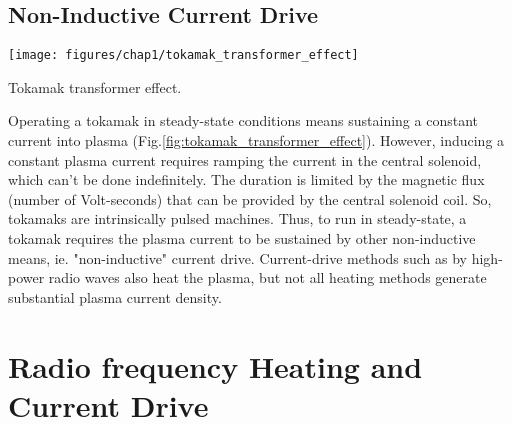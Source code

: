 \subsection{Non-Inductive Current Drive}
\begin{marginfigure}
	\texttt{[image: figures/chap1/tokamak\_transformer\_effect]}
	\caption{Tokamak transformer effect.}
	\label{fig:tokamak_transformer_effect}
\end{marginfigure}
Operating a tokamak in steady-state conditions means sustaining a constant current into plasma (Fig.\ref{fig:tokamak_transformer_effect}). However, inducing a constant plasma current requires ramping the current in the central solenoid, which can't be done indefinitely. The duration is limited by the magnetic flux (number of Volt-seconds) that can be provided by the central solenoid coil. So, tokamaks are intrinsically pulsed machines.
Thus, to run in steady-state, a tokamak requires the plasma current to be sustained by other non-inductive means, ie. "non-inductive" current drive. Current-drive methods such as by high-power radio waves also heat the plasma, but not all heating methods generate substantial plasma current density. 




\section[RF Heating and Current Drive]{Radio frequency Heating and Current Drive}

